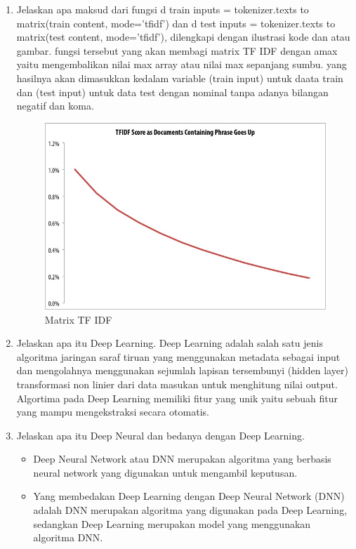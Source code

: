 \begin{enumerate}
\item Jelaskan apa maksud dari fungsi d train inputs = tokenizer.texts to matrix(train content, mode=’tfidf’) dan d test inputs = tokenizer.texts to matrix(test content, mode=’tfidf’), dilengkapi dengan ilustrasi kode dan atau gambar.
\subitem fungsi tersebut yang akan membagi matrix TF IDF dengan amax yaitu mengembalikan nilai max array atau nilai max sepanjang sumbu. yang hasilnya akan dimasukkan kedalam variable (train input) untuk daata train dan (test input) untuk data test dengan nominal tanpa adanya bilangan negatif dan koma.
\begin{figure}[!htbp]
	\centerline{\includegraphics[width=1\textwidth]{figures/andi/7-6.JPG}}
	\caption{Matrix TF IDF}
	\label{Teori}
\end{figure}

\item Jelaskan apa itu Deep Learning.
\subitem Deep Learning adalah salah satu jenis algoritma jaringan saraf tiruan yang menggunakan metadata sebagai input dan mengolahnya menggunakan sejumlah lapisan tersembunyi (hidden layer) transformasi non linier dari data masukan untuk menghitung nilai output. Algortima pada Deep Learning memiliki fitur yang unik yaitu sebuah fitur yang mampu mengekstraksi secara otomatis.

\item Jelaskan apa itu Deep Neural dan bedanya dengan Deep Learning.
\begin{itemize}
\item Deep Neural Network atau DNN merupakan algoritma yang berbasis neural network yang digunakan untuk mengambil keputusan.

\item Yang membedakan Deep Learning dengan  Deep Neural Network (DNN) adalah DNN merupakan algoritma yang digunakan pada Deep Learning, sedangkan Deep Learning merupakan model yang menggunakan algoritma DNN.
\end{itemize}
\end{enumerate}


